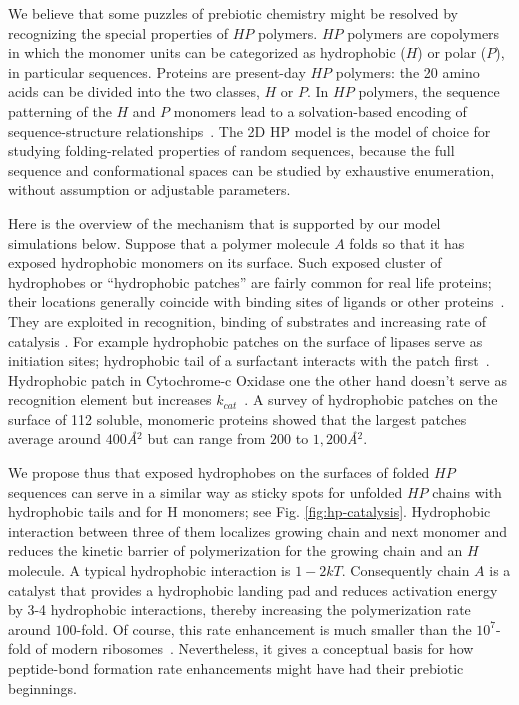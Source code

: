 \documentclass[journal=jacsat,manuscript=article,layout=twocolumn]{achemso}
\begin{document}
 We believe that some puzzles of prebiotic chemistry might be resolved by recognizing the 
 special properties of $HP$ polymers.  $HP$ polymers are copolymers in which the monomer units can 
be categorized as hydrophobic ($H$) or polar ($P$), in particular sequences.  Proteins are 
present-day $HP$ polymers: the 20 amino acids can be divided into the two classes, $H$ or $P$.  In 
$HP$ polymers, the sequence patterning of the $H$ and $P$ monomers lead to a solvation-based 
encoding of sequence-structure relationships~\cite{Chan1991}.  The 2D HP model is the model of 
choice for studying folding-related properties of random sequences, because the full sequence and 
conformational spaces can be studied by exhaustive enumeration, without assumption or adjustable 
parameters. 

   Here is the overview of the mechanism that is supported by our model simulations below.  
   Suppose that a polymer molecule $A$ folds so that it has exposed hydrophobic monomers on its 
surface.
Such exposed cluster of hydrophobes or ``hydrophobic patches'' are fairly common for real 
life proteins; their locations generally coincide with binding sites of ligands or other 
proteins~\cite{Lijnzaad1996}. They are exploited in recognition, binding of substrates 
and increasing rate of catalysis \cite{MitchellGuss1983,Lijnzaad1996,VanEe1997,Witt1998}. For 
example hydrophobic patches on the surface of lipases serve as initiation sites; 
hydrophobic tail of a surfactant interacts with the patch first~\cite{VanEe1997}. Hydrophobic patch 
in Cytochrome-c Oxidase one the other hand doesn't serve as recognition element but increases 
$k_{cat}$~\cite{Witt1998}. A survey of hydrophobic patches on the surface of 112 soluble, monomeric 
proteins\cite{Lijnzaad1996} showed that the largest patches average around $400$\textit{\AA}$^2$ 
but can range from $200$ to $1,200$\textit{\AA}$^2$.

 We propose thus that exposed hydrophobes on the surfaces of folded $HP$ sequences can serve in a 
similar way as sticky spots for unfolded $HP$ chains with hydrophobic tails and for H monomers; see 
Fig. \ref{fig:hp-catalysis}.  Hydrophobic interaction between three of them localizes growing chain 
and next monomer and reduces the kinetic barrier of polymerization for the growing chain and an $H$ 
molecule.  A typical hydrophobic interaction is $1-2kT$.  Consequently chain $A$ is a 
catalyst that provides a hydrophobic landing pad and reduces activation energy by 3-4 hydrophobic 
interactions, thereby increasing the polymerization rate around $ 100$-fold.  Of course, this rate 
enhancement is much smaller than the 
$10^7$-fold of modern ribosomes~\cite{Sievers2004a}. Nevertheless, it gives a conceptual basis for 
how peptide-bond formation rate enhancements might have had their prebiotic beginnings.  
\end{document}
